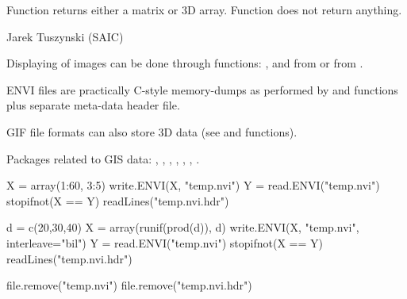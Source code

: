 \begin{Value}
Function  returns either a matrix or 3D array. 
Function  does not return anything.
\end{Value}
\begin{Author}\relax
Jarek Tuszynski (SAIC) 
\end{Author}
\begin{SeeAlso}\relax
Displaying of images can be done through functions: ,
 and  from 
 or  from .

ENVI files are practically C-style memory-dumps as performed by 
 and  functions plus separate 
meta-data header file.

GIF file formats can also store 3D data (see  and 
 functions).

Packages related to GIS data: , , , 
, , , .
\end{SeeAlso}
\begin{Examples}
\begin{ExampleCode}
  X = array(1:60, 3:5)
  write.ENVI(X, "temp.nvi")
  Y = read.ENVI("temp.nvi")
  stopifnot(X == Y)
  readLines("temp.nvi.hdr")
  
  d = c(20,30,40)
  X = array(runif(prod(d)), d)
  write.ENVI(X, "temp.nvi", interleave="bil")
  Y = read.ENVI("temp.nvi")
  stopifnot(X == Y)
  readLines("temp.nvi.hdr")
  
  file.remove("temp.nvi")
  file.remove("temp.nvi.hdr")
\end{ExampleCode}
\end{Examples}

